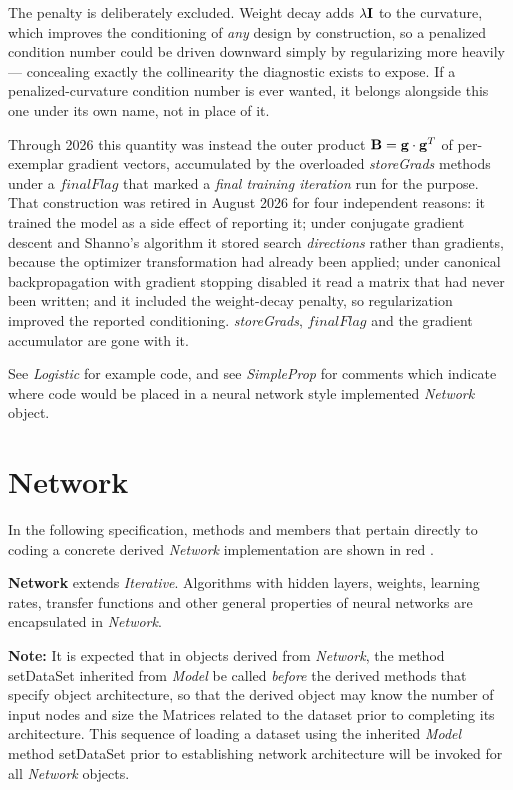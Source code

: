 \documentclass{report}
\def\beginred{\color{red}}
\def\endcolor{\color{black}}
\begin{document}
The penalty is deliberately excluded.  Weight decay adds
$\lambda {\bf I}$ to the curvature, which improves the conditioning of
{\em any} design by construction, so a penalized condition number could
be driven downward simply by regularizing more heavily --- concealing
exactly the collinearity the diagnostic exists to expose.  If a
penalized-curvature condition number is ever wanted, it belongs
alongside this one under its own name, not in place of it.

\medskip

  Through 2026 this quantity was instead
the outer product ${\bf B} = {\bf g} \cdot {\bf g}^T$ of per-exemplar
gradient vectors, accumulated by the overloaded {\em storeGrads}
methods under a $finalFlag$ that marked a {\em final training
iteration} run for the purpose.  That construction was retired in
August 2026 for four independent reasons: it trained the model as a
side effect of reporting it; under conjugate gradient descent and
Shanno's algorithm it stored search {\em directions} rather than
gradients, because the optimizer transformation had already been
applied; under canonical backpropagation with gradient stopping
disabled it read a matrix that had never been written; and it included
the weight-decay penalty, so regularization improved the reported
conditioning.  {\em storeGrads}, $finalFlag$ and the gradient
accumulator are gone with it.

See {\em Logistic} for example code, and see {\em SimpleProp} for
comments which indicate where code would be placed in a neural network
style implemented {\em Network} object.

\section{Network}

In the following specification, methods and members that pertain
directly to coding a concrete derived {\em Network} implementation are
shown in \beginred red \endcolor.

{\bf Network} extends {\em Iterative}. Algorithms with hidden layers,
weights, learning rates, transfer functions and other general
properties of neural networks are encapsulated in {\em Network}.

{\bf Note:} It is expected that in objects derived from {\em Network},
the method setDataSet inherited from {\em Model} be called {\em
before} the derived methods that specify object architecture, so that
the derived object may know the number of input nodes and size the
Matrices related to the dataset prior to completing its architecture.
This sequence of loading a dataset using the inherited {\em Model}
method setDataSet prior to establishing network architecture will be
invoked for all {\em Network} objects.
\end{document}
